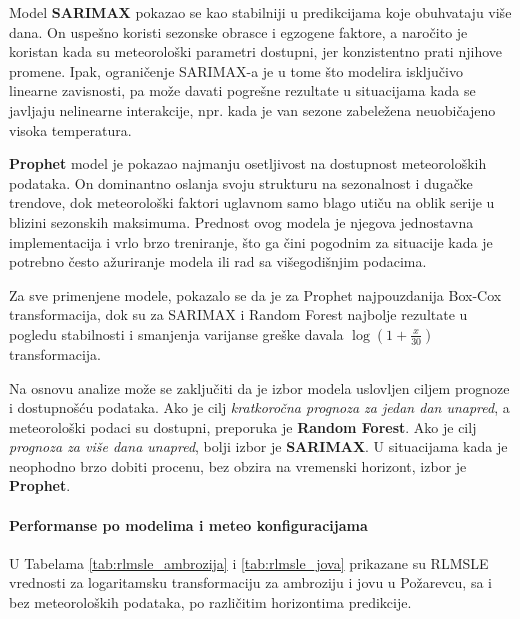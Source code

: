 \documentclass[12pt]{article}
\begin{document}
Model \textbf{SARIMAX} pokazao se kao stabilniji u predikcijama koje obuhvataju više dana. On uspešno koristi sezonske obrasce i egzogene faktore, a naročito je koristan kada su meteorološki parametri dostupni, jer konzistentno prati njihove promene. Ipak, ograničenje SARIMAX-a je u tome što modelira isključivo linearne zavisnosti, pa može davati pogrešne rezultate u situacijama kada se javljaju nelinearne interakcije, npr. kada je van sezone zabeležena neuobičajeno visoka temperatura.

\textbf{Prophet} model je pokazao najmanju osetljivost na dostupnost meteoroloških podataka. On dominantno oslanja svoju strukturu na sezonalnost i dugačke trendove, dok meteorološki faktori uglavnom samo blago utiču na oblik serije u blizini sezonskih maksimuma. Prednost ovog modela je njegova jednostavna implementacija i vrlo brzo treniranje, što ga čini pogodnim za situacije kada je potrebno često ažuriranje modela ili rad sa višegodišnjim podacima.

Za sve primenjene modele, pokazalo se da je za Prophet najpouzdanija Box-Cox transformacija, dok su za SARIMAX i Random Forest najbolje rezultate u pogledu stabilnosti i smanjenja varijanse greške davala $\log(1 + \frac{x}{30})$ transformacija.

Na osnovu analize može se zaključiti da je izbor modela uslovljen ciljem prognoze i dostupnošću podataka. Ako je cilj \textit{kratkoročna prognoza za jedan dan unapred}, a meteorološki podaci su dostupni, preporuka je \textbf{Random Forest}. Ako je cilj \textit{prognoza za više dana unapred}, bolji izbor je \textbf{SARIMAX}. U situacijama kada je neophodno brzo dobiti procenu, bez obzira na vremenski horizont, izbor je \textbf{Prophet}.

\paragraph{Performanse po modelima i meteo konfiguracijama}

U Tabelama \ref{tab:rlmsle_ambrozija} i \ref{tab:rlmsle_jova} prikazane su RLMSLE vrednosti za logaritamsku transformaciju za ambroziju i jovu u Požarevcu, sa i bez meteoroloških podataka, po različitim horizontima predikcije. 
\end{document}
